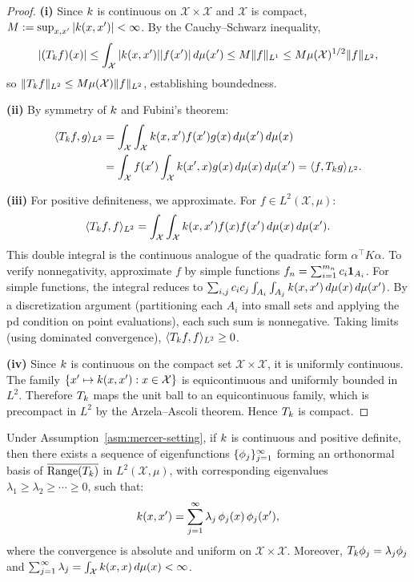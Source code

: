 \documentclass[11pt,a4paper]{article}
\begin{document}
\begin{proof}
\textbf{(i)} Since $k$ is continuous on $\mathcal{X} \times
\mathcal{X}$ and $\mathcal{X}$ is compact, $M :=
\sup_{x, x'} |k(x, x')| < \infty$. By the Cauchy--Schwarz
inequality,
\[
|(T_k f)(x)| \le \int_{\mathcal{X}} |k(x, x')|
|f(x')| \, d\mu(x') \le M \|f\|_{L^1} \le M \mu(\mathcal{X})^{1/2}
\|f\|_{L^2},
\]
so $\|T_k f\|_{L^2} \le M \mu(\mathcal{X}) \|f\|_{L^2}$,
establishing boundedness.

\textbf{(ii)} By symmetry of $k$ and Fubini's theorem:
\begin{align*}
\langle T_k f, g \rangle_{L^2}
&= \int_{\mathcal{X}} \int_{\mathcal{X}} k(x, x') f(x')
g(x) \, d\mu(x') \, d\mu(x) \\
&= \int_{\mathcal{X}} f(x') \int_{\mathcal{X}} k(x', x)
g(x) \, d\mu(x) \, d\mu(x')
= \langle f, T_k g \rangle_{L^2}.
\end{align*}

\textbf{(iii)} For positive definiteness, we approximate. For
$f \in L^2(\mathcal{X}, \mu)$:
\[
\langle T_k f, f \rangle_{L^2}
= \int_{\mathcal{X}} \int_{\mathcal{X}} k(x, x') f(x)
f(x') \, d\mu(x) \, d\mu(x').
\]
This double integral is the continuous analogue of the quadratic
form $\alpha^\top K \alpha$. To verify nonnegativity, approximate
$f$ by simple functions $f_n = \sum_{i=1}^{m_n} c_i
\mathbf{1}_{A_i}$. For simple functions, the integral reduces to
$\sum_{i,j} c_i c_j \int_{A_i} \int_{A_j} k(x, x') \,
d\mu(x) \, d\mu(x')$. By a discretization argument (partitioning
each $A_i$ into small sets and applying the pd condition on point
evaluations), each such sum is nonneg\-ative. Taking limits (using
dominated convergence), $\langle T_k f, f \rangle_{L^2} \ge 0$.

\textbf{(iv)} Since $k$ is continuous on the compact set
$\mathcal{X} \times \mathcal{X}$, it is uniformly continuous.
The family $\{x' \mapsto k(x, x') : x \in \mathcal{X}\}$
is equicontinuous and uniformly bounded in $L^2$. Therefore
$T_k$ maps the unit ball to an equicontinuous family, which
is precompact in $L^2$ by the Arzela--Ascoli theorem. Hence
$T_k$ is compact.
\end{proof}

\begin{theorem}
\label{thm:mercer}
Under Assumption~\ref{asm:mercer-setting}, if $k$ is
continuous and positive definite, then there exists a sequence
of eigenfunctions $\{\phi_j\}_{j=1}^\infty$ forming an
orthonormal basis of $\overline{\mathrm{Range}(T_k)}$ in
$L^2(\mathcal{X}, \mu)$, with corresponding eigenvalues
$\lambda_1 \ge \lambda_2 \ge \cdots \ge 0$, such that:
\begin{equation}
\label{eq:mercer-expansion}
k(x, x') = \sum_{j=1}^\infty \lambda_j \, \phi_j(x) \,
\phi_j(x'),
\end{equation}
where the convergence is absolute and uniform on
$\mathcal{X} \times \mathcal{X}$. Moreover, $T_k \phi_j
= \lambda_j \phi_j$ and $\sum_{j=1}^\infty \lambda_j =
\int_{\mathcal{X}} k(x, x) \, d\mu(x) < \infty$.
\end{theorem}
\end{document}
